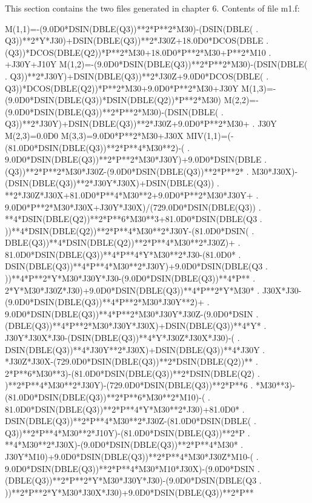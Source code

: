 This section contains the two files generated in chapter 6.
Contents of file m1.f:
\begin{framedverbatim}
      M(1,1)=-(9.0D0*DSIN(DBLE(Q3))**2*P**2*M30)-(DSIN(DBLE(
     . Q3))**2*Y*J30)+DSIN(DBLE(Q3))**2*J30Z+18.0D0*DCOS(DBLE
     . (Q3))*DCOS(DBLE(Q2))*P**2*M30+18.0D0*P**2*M30+P**2*M10
     . +J30Y+J10Y
      M(1,2)=-(9.0D0*DSIN(DBLE(Q3))**2*P**2*M30)-(DSIN(DBLE(
     . Q3))**2*J30Y)+DSIN(DBLE(Q3))**2*J30Z+9.0D0*DCOS(DBLE(
     . Q3))*DCOS(DBLE(Q2))*P**2*M30+9.0D0*P**2*M30+J30Y
      M(1,3)=-(9.0D0*DSIN(DBLE(Q3))*DSIN(DBLE(Q2))*P**2*M30)
      M(2,2)=-(9.0D0*DSIN(DBLE(Q3))**2*P**2*M30)-(DSIN(DBLE(
     . Q3))**2*J30Y)+DSIN(DBLE(Q3))**2*J30Z+9.0D0*P**2*M30+
     . J30Y
      M(2,3)=0.0D0
      M(3,3)=9.0D0*P**2*M30+J30X
      MIV(1,1)=(-(81.0D0*DSIN(DBLE(Q3))**2*P**4*M30**2)-(
     . 9.0D0*DSIN(DBLE(Q3))**2*P**2*M30*J30Y)+9.0D0*DSIN(DBLE
     . (Q3))**2*P**2*M30*J30Z-(9.0D0*DSIN(DBLE(Q3))**2*P**2*
     . M30*J30X)-(DSIN(DBLE(Q3))**2*J30Y*J30X)+DSIN(DBLE(Q3))
     . **2*J30Z*J30X+81.0D0*P**4*M30**2+9.0D0*P**2*M30*J30Y+
     . 9.0D0*P**2*M30*J30X+J30Y*J30X)/(729.0D0*DSIN(DBLE(Q3))
     . **4*DSIN(DBLE(Q2))**2*P**6*M30**3+81.0D0*DSIN(DBLE(Q3
     . ))**4*DSIN(DBLE(Q2))**2*P**4*M30**2*J30Y-(81.0D0*DSIN(
     . DBLE(Q3))**4*DSIN(DBLE(Q2))**2*P**4*M30**2*J30Z)+
     . 81.0D0*DSIN(DBLE(Q3))**4*P**4*Y*M30**2*J30-(81.0D0*
     . DSIN(DBLE(Q3))**4*P**4*M30**2*J30Y)+9.0D0*DSIN(DBLE(Q3
     . ))**4*P**2*Y*M30*J30Y*J30-(9.0D0*DSIN(DBLE(Q3))**4*P**
     . 2*Y*M30*J30Z*J30)+9.0D0*DSIN(DBLE(Q3))**4*P**2*Y*M30*
     . J30X*J30-(9.0D0*DSIN(DBLE(Q3))**4*P**2*M30*J30Y**2)+
     . 9.0D0*DSIN(DBLE(Q3))**4*P**2*M30*J30Y*J30Z-(9.0D0*DSIN
     . (DBLE(Q3))**4*P**2*M30*J30Y*J30X)+DSIN(DBLE(Q3))**4*Y*
     . J30Y*J30X*J30-(DSIN(DBLE(Q3))**4*Y*J30Z*J30X*J30)-(
     . DSIN(DBLE(Q3))**4*J30Y**2*J30X)+DSIN(DBLE(Q3))**4*J30Y
     . *J30Z*J30X-(729.0D0*DSIN(DBLE(Q3))**2*DSIN(DBLE(Q2))**
     . 2*P**6*M30**3)-(81.0D0*DSIN(DBLE(Q3))**2*DSIN(DBLE(Q2)
     . )**2*P**4*M30**2*J30Y)-(729.0D0*DSIN(DBLE(Q3))**2*P**6
     . *M30**3)-(81.0D0*DSIN(DBLE(Q3))**2*P**6*M30**2*M10)-(
     . 81.0D0*DSIN(DBLE(Q3))**2*P**4*Y*M30**2*J30)+81.0D0*
     . DSIN(DBLE(Q3))**2*P**4*M30**2*J30Z-(81.0D0*DSIN(DBLE(
     . Q3))**2*P**4*M30**2*J10Y)-(81.0D0*DSIN(DBLE(Q3))**2*P
     . **4*M30**2*J30X)-(9.0D0*DSIN(DBLE(Q3))**2*P**4*M30*
     . J30Y*M10)+9.0D0*DSIN(DBLE(Q3))**2*P**4*M30*J30Z*M10-(
     . 9.0D0*DSIN(DBLE(Q3))**2*P**4*M30*M10*J30X)-(9.0D0*DSIN
     . (DBLE(Q3))**2*P**2*Y*M30*J30Y*J30)-(9.0D0*DSIN(DBLE(Q3
     . ))**2*P**2*Y*M30*J30X*J30)+9.0D0*DSIN(DBLE(Q3))**2*P**

\end{framedverbatim}
